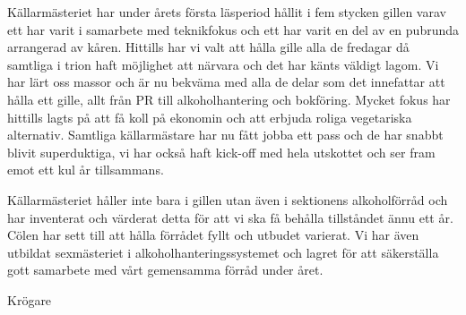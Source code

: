\documentclass[../_main/handlingar.tex]{subfiles}
\begin{document}

Källarmästeriet har under årets första läsperiod hållit i fem stycken gillen varav ett har varit i samarbete med teknikfokus och ett har varit en del av en pubrunda arrangerad av kåren. Hittills har vi valt att hålla gille alla de fredagar då samtliga i trion haft möjlighet att närvara och det har känts väldigt lagom. Vi har lärt oss massor och är nu bekväma med alla de delar som det innefattar att hålla ett gille, allt från PR till alkoholhantering och bokföring. Mycket fokus har hittills lagts på att få koll på ekonomin och att erbjuda roliga vegetariska alternativ. Samtliga källarmästare har nu fått jobba ett pass och de har snabbt blivit superduktiga, vi har också haft kick-off med hela utskottet och ser fram emot ett kul år tillsammans. 

Källarmästeriet håller inte bara i gillen utan även i sektionens alkoholförråd och har inventerat och värderat detta för att vi ska få behålla tillståndet ännu ett år. Cölen har sett till att hålla förrådet fyllt och utbudet varierat. Vi har även utbildat sexmästeriet i alkoholhanteringssystemet och lagret för att säkerställa gott samarbete med vårt gemensamma förråd under året. 


\begin{signatures}{1}
    \mvh
    \signature{\krog}{Krögare}
\end{signatures}
\end{document}
